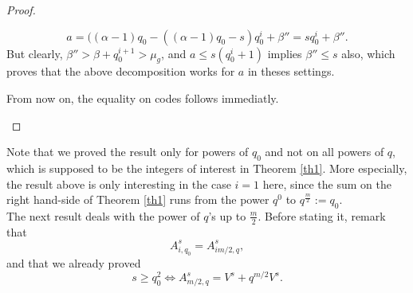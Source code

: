 \documentclass[a4paper]{article}
\newcommand{\calH}{\mathcal{H}}
\begin{document}
\begin{proof}
\begin{enumerate}
\begin{itemize}
\begin{itemize}
        \[ a = ((\alpha-1)q_0 - ((\alpha-1)q_0-s)q_0^i + \beta'' = sq_0^i + \beta''.\]
        But clearly, $\beta'' > \beta + q_0^{i+1} > \mu_g$, and $a \leq s(q_0^i+1)$ implies $\beta'' \leq s$ also, which proves that the above decomposition works for $a$ in theses settings.
    \end{itemize}
From now on, the equality on codes follows immediatly.
\end{itemize}
\end{enumerate}
\end{proof}


Note that we proved the result only for powers of $q_0$ and not on all powers of $q$, which is supposed to be the integers of interest in Theorem \ref{th1}. More especially, the result above is only interesting in the case $i=1$ here, since the sum on the right hand-side of Theorem \ref{th1} runs from the power $q^0$ to $q^{\frac{m}{2} }:=q_0$. \\
The next result deals with the power of $q$'s up to $\frac{m}{2}$. Before stating it, remark that 
\[ A_{i,q_0}^s = A^s_{im/2,q},\]
and that we already proved
\[ s \geq q_0^2 \iff A^s_{m/2,q}=V^s+q^{m/2}V^s.\]
\end{document}
